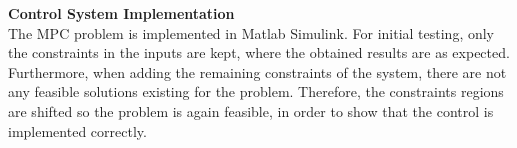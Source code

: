 \textbf{Control System Implementation}\\
The MPC problem is implemented in Matlab Simulink. For initial testing, only the constraints in the inputs are kept, where the obtained results are as expected. Furthermore, when adding the remaining constraints of the system, there are not any feasible solutions existing for the problem. Therefore, the constraints regions are shifted so the problem is again feasible, in order to show that the control is implemented correctly. 





